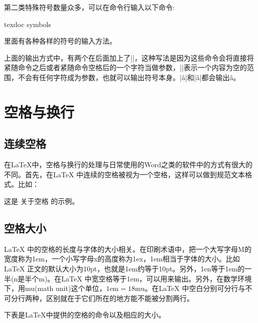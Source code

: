 {第二类特殊符号数量众多，可以在命令行输入以下命令:
\begin{shellcmd}
	texdoc symbols
\end{shellcmd}

里面有各种各样的符号的输入方法。

上面的输出方式中，有两个在后面加上了\texinline|{}|，这种写法是因为这些命令会将直接将紧随命令之后或者紧随命令空格后的一个字符当做参数，\texinline|{}|表示一个内容为空的范围，不会有任何字符成为参数，也就可以输出符号本身。\texinline|\^ a|和\texinline|\^a|都会输出\^a。

\section{空格与换行}
\subsection{连续空格}
在\LaTeX 中，空格与换行的处理与日常使用的Word之类的软件中的方式有很大的不同。首先，在\LaTeX
中连续的空格被视为一个空格，这样可以做到规范文本格式。比如：
\begin{texlst}
	这是 关于空格    的示例。
\end{texlst}

\subsection{空格大小}
\LaTeX
中的空格的长度与字体的大小相关。在印刷术语中，把一个大写字母M的宽度称为1em，一个小写字母x的高度称为1ex，1em相当于字体的大小。比如\LaTeX
正文的默认大小为10pt，也就是1em约等于10pt。另外，1en等于1em的一半(n是半个m)。在\LaTeX
中宽空格等于1em，可以用\texinline{\quad}来输出。另外，在数学环境下，用mu(math unit)这个单位，$1\text{em}=18\text{mu}$。在\LaTeX
中空白分别可分行与不可分行两种，区别就在于它们所在的地方能不能被分割两行。

下表是\LaTeX 中提供的空格的命令以及相应的大小。

}
